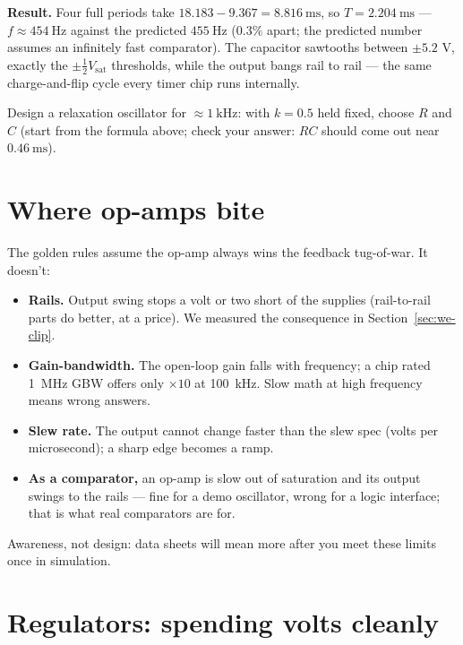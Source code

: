 \textbf{Result.} Four full periods take
$18.183 - 9.367 = \qty{8.816}{\milli\second}$, so
$T = \qty{2.204}{\milli\second}$ — $f \approx \qty{454}{\hertz}$ against
the predicted $\qty{455}{\hertz}$ ($0.3\%$ apart; the predicted number
assumes an infinitely fast comparator). The capacitor sawtooths between
$\pm 5.2$ V, exactly the $\pm\frac{1}{2}V_{\mathrm{sat}}$ thresholds,
while the output bangs rail to rail — the same charge-and-flip cycle
every timer chip runs internally.

\begin{exercise}
Design a relaxation oscillator for $\approx\qty{1}{\kilo\hertz}$:
with $k = 0.5$ held fixed, choose $R$ and $C$ (start from the formula
above; check your answer: $RC$ should come out near
$\qty{0.46}{\milli\second}$).
\end{exercise}

\section{Where op-amps bite}
\label{sec:bite}

The golden rules assume the op-amp always wins the feedback tug-of-war.
It doesn't:

\begin{itemize}
\item \textbf{Rails.} Output swing stops a volt or two short of the
supplies (rail-to-rail parts do better, at a price). We measured the
consequence in Section~\ref{sec:we-clip}.
\item \textbf{Gain-bandwidth.} The open-loop gain falls with frequency;
a chip rated \qty{1}{\mega\hertz} GBW offers only $\times10$ at
\qty{100}{\kilo\hertz}. Slow math at high
frequency means wrong answers.
\item \textbf{Slew rate.} The output cannot change faster than the
slew spec (volts per microsecond); a sharp edge becomes a ramp.
\item \textbf{As a comparator,} an op-amp is slow out of saturation and
its output swings to the rails — fine for a demo oscillator, wrong for a
logic interface; that is what real comparators are for.
\end{itemize}

Awareness, not design: data sheets will mean more after you meet these
limits once in simulation.

\section{Regulators: spending volts cleanly}
\label{sec:regulator}

